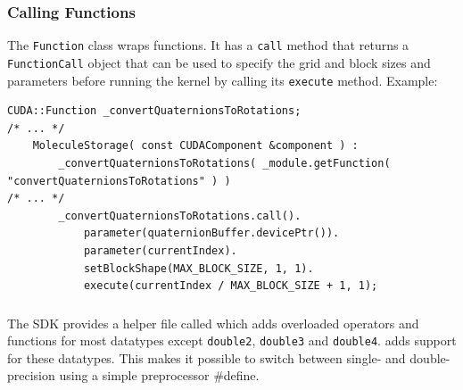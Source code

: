\subsubsection{Calling \cuda{} Functions}
The \lstinline!Function! class wraps \cuda{} functions. It has a \lstinline!call! method that returns a \lstinline!FunctionCall! object that can be used to specify the grid and block sizes and parameters before running the \cuda{} kernel by calling its \lstinline!execute! method.
Example:
\begin{lstlisting}[label=cudafunctionhelpers,caption=\cuda{} helper classes for function calls]
	CUDA::Function _convertQuaternionsToRotations;
/* ... */		
	MoleculeStorage( const CUDAComponent &component ) :
		_convertQuaternionsToRotations( _module.getFunction( "convertQuaternionsToRotations" ) )
/* ... */
		_convertQuaternionsToRotations.call().
			parameter(quaternionBuffer.devicePtr()).
			parameter(currentIndex).
			setBlockShape(MAX_BLOCK_SIZE, 1, 1).
			execute(currentIndex / MAX_BLOCK_SIZE + 1, 1);
\end{lstlisting}

\subsubsection{}
The \cuda{} SDK provides a helper file called  which adds overloaded operators and functions for most \cuda{} datatypes except \lstinline!double2!, \lstinline!double3! and \lstinline!double4!.
 adds support for these datatypes.
This makes it possible to switch between single- and double-precision using a simple preprocessor \#define.


